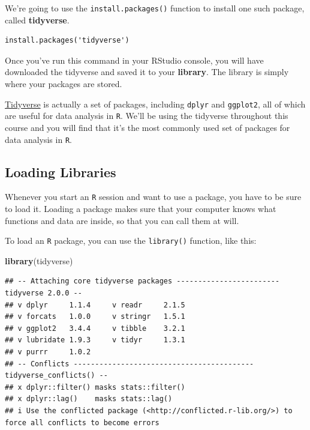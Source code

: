 \documentclass[
]{book}
\newenvironment{Shaded}{\begin{snugshade}}{\end{snugshade}}
\newcommand{\FunctionTok}[1]{\textcolor[rgb]{0.13,0.29,0.53}{\textbf{#1}}}
\newcommand{\NormalTok}[1]{#1}
\begin{document}
We're going to use the \texttt{install.packages()} function to install one such package, called \textbf{tidyverse}.

\begin{verbatim}
install.packages('tidyverse')
\end{verbatim}

Once you've run this command in your RStudio console, you will have downloaded the tidyverse and saved it to your \textbf{library}. The library is simply where your packages are stored.

\href{https://tidyverse.tidyverse.org/}{Tidyverse} is actually a set of packages, including \texttt{dplyr} and \texttt{ggplot2}, all of which are useful for data analysis in \texttt{R}. We'll be using the tidyverse throughout this course and you will find that it's the most commonly used set of packages for data analysis in \texttt{R}.

\hypertarget{loading-libraries}{%
\subsection{Loading Libraries}\label{loading-libraries}}

Whenever you start an \texttt{R} session and want to use a package, you have to be sure to load it. Loading a package makes sure that your computer knows what functions and data are inside, so that you can call them at will.

To load an \texttt{R} package, you can use the \texttt{library()} function, like this:

\begin{Shaded}
\begin{Highlighting}[]
\FunctionTok{library}\NormalTok{(tidyverse)}
\end{Highlighting}
\end{Shaded}

\begin{verbatim}
## -- Attaching core tidyverse packages ------------------------ tidyverse 2.0.0 --
## v dplyr     1.1.4     v readr     2.1.5
## v forcats   1.0.0     v stringr   1.5.1
## v ggplot2   3.4.4     v tibble    3.2.1
## v lubridate 1.9.3     v tidyr     1.3.1
## v purrr     1.0.2     
## -- Conflicts ------------------------------------------ tidyverse_conflicts() --
## x dplyr::filter() masks stats::filter()
## x dplyr::lag()    masks stats::lag()
## i Use the conflicted package (<http://conflicted.r-lib.org/>) to force all conflicts to become errors
\end{verbatim}
\end{document}
